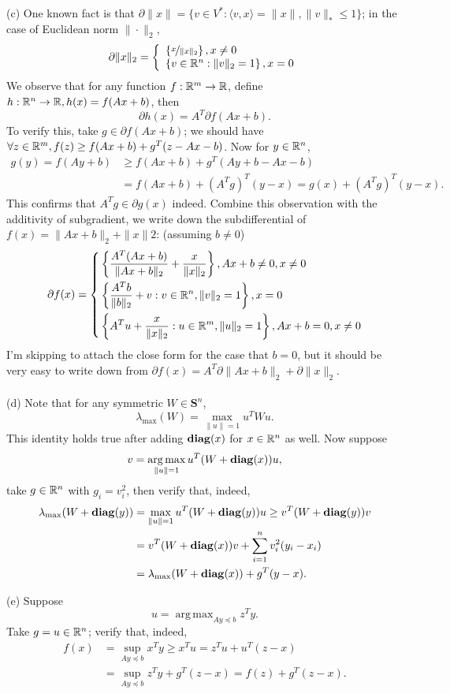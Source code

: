 \documentclass[12pt,a4paper]{article}
\newcommand{\ra}[1]{\ifnum #1=1\rightarrow\fi\ifnum #1=2\Rightarrow\fi\ifnum #1=3\Rrightarrow\fi\ifnum #1=4\rightrightarrows\fi\ifnum #1=5\rightleftarrows\fi\ifnum #1=6\mapsto\fi\ifnum #1=7\iffalse\fi\fi\ifnum #1=8\twoheadrightarrow\fi\ifnum #1=9\rightharpoonup\fi\ifnum #1=0\rightharpoondown\fi}
\renewcommand{\l}{\left}\renewcommand{\r}{\right}
\newcommand{\SUM}[2]{\sum\limits_{#1}^{#2}}
\DeclareMathOperator*{\argmax}{arg\,max}
\def\R{\ifmmode\mathbb R\fi}
\def\vS{\mathbf{S}}
\def\diag{\mbox{\textbf{diag}}}
\begin{document}
\noindent(c) One known fact is that $\partial \|x\| = \{v \in V^\ast : \langle v, x \rangle = \|x\|, \|v\|_\ast \leq 1\}$; in the case of Euclidean norm $\|\cdot\|_2$, 
\begin{equation*}
  \partial \|x\|_2 = \l\{
    \begin{array}{l}
      \l\{\nicefrac x{\|x\|_2}\r\}, x \neq 0 \\
      \l\{v \in \R^n : \|v\|_2 = 1\r\}, x = 0
    \end{array}
    \r.
\end{equation*}
We observe that for any function $f: \R^m \ra1 \R$, define $h: \R^n \ra1 \R, h(x) = f(Ax+b)$, then
$$\partial h(x) = A^T \partial f(Ax + b).$$
To verify this, take $g\in \partial f(Ax + b)$; we should have $\forall z\in\R^m, f(z) \geq f(Ax+b) + g^T(z-Ax-b)$. Now for $y\in \R^n$, 
\begin{align*}
  g(y) = f(Ay+b) & \geq f(Ax+b) + g^T(Ay+b - Ax-b) \\
                 & = f(Ax+b) + (A^Tg)^T(y-x) = g(x) + (A^Tg)^T(y-x).
\end{align*}
This confirms that $A^Tg \in \partial g(x)$ indeed. Combine this observation with the additivity of subgradient, we write down the subdifferential of $f(x) = \|Ax+b\|_2 + \|x\|2$: (assuming $b\neq 0$)
$$\partial f(x) = \l\{
  \begin{align*}
    &\l\{\frac{A^T(Ax+b)}{\|Ax+b\|_2} + \frac{x}{\|x\|_2}\r\}, Ax+b \neq 0, x\neq 0 \\
    &\l\{\frac{A^Tb}{\|b\|_2} + v : v\in\R^n, \|v\|_2 = 1\r\}, x = 0\\
    &\l\{A^Tu + \frac{x}{\|x\|_2} : u \in \R^m, \|u\|_2 = 1 \r\}, Ax+b = 0, x \neq 0
  \end{align*}
  \r.$$
I'm skipping to attach the close form for the case that $b= 0$, but it should be very easy to write down from $\partial f(x) = A^T\partial \|Ax+b\|_2 + \partial \|x\|_2$. \\
\\

\noindent(d) Note that for any symmetric $W \in \vS^n$, 
$$\lambda_{\max}(W) = \max_{\|u\|=1} u^T W u.$$
This identity holds true after adding $\diag(x)$ for $x\in\R^n$ as well.
Now suppose 
$$v = \argmax_{\|u\|=1} u^T(W + \diag(x))u,$$
take $g \in \R^n$ with $g_i = v_i^2$, then verify that, indeed,
\begin{align*}
\lambda_{\max}(W + \diag(y)) & = \max_{\|u\|=1} u^T (W + \diag(y)) u \geq v^T (W + \diag(y)) v \\
                             & = v^T (W + \diag(x)) v + \SUM{i=1}n v_i^2(y_i - x_i) \\
                             & = \lambda_{\max}(W + \diag(x)) + g^T(y-x).
\end{align*}

\noindent(e) Suppose 
$$u = \argmax_{Ay \preceq b} z^Ty.$$
Take $g = u \in \R^n$; verify that, indeed,
\begin{align*}
  f(x) &= \sup_{Ay \preceq b} x^Ty \geq x^Tu = z^Tu + u^T(z-x) \\
       &= \sup_{Ay \preceq b} z^Ty + g^T(z-x) = f(z) + g^T(z-x).
\end{align*}
\end{document}
